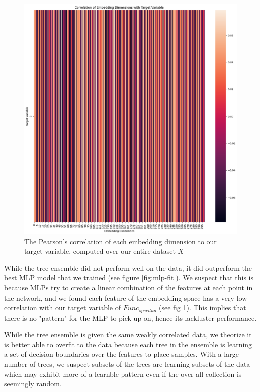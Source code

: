 \documentclass[nohyperref]{article}
\theoremstyle{plain}
\theoremstyle{definition}
\theoremstyle{remark}
\begin{document}
\begin{figure}[h!]
    \centerline{\includegraphics[width=\columnwidth]{corr-of-each-feature-w-speedup}}
    \caption{The Pearson's correlation of each embedding dimension to our target variable, computed over our entire dataset $X$}
    \label{fig:corr}
\end{figure}


While the tree ensemble did not perform well on the data, it did outperform the best MLP model that we trained (see figure \ref{fig:mlp-fit}). We suspect that this is because MLPs try to create a linear combination of the features at each point in the network, and we found each feature of the embedding space has a very low correlation with our target variable of $Func_{speedup}$ (see fig \ref{fig:corr}). This implies that there is no "pattern" for the MLP to pick up on, hence its lackluster performance.

While the tree ensemble is given the same weakly correlated data, we theorize it is better able to overfit to the data because each tree in the ensemble is learning a set of decision boundaries over the features to place samples. With a large number of trees, we suspect subsets of the trees are learning subsets of the data which may exhibit more of a learnble pattern even if the over all collection is seemingly random.
\end{document}
